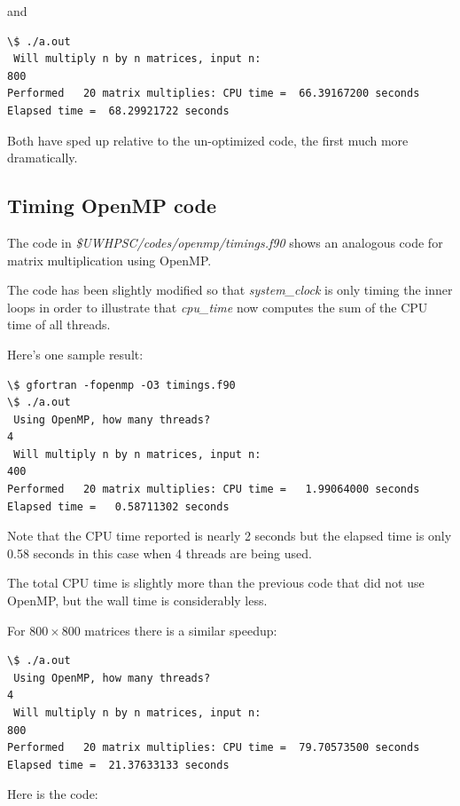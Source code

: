 \documentclass[letterpaper,10pt,english]{sphinxmanual}
\begin{document}
and

\begin{Verbatim}[commandchars=\\\{\}]
\$ ./a.out
 Will multiply n by n matrices, input n:
800
Performed   20 matrix multiplies: CPU time =  66.39167200 seconds
Elapsed time =  68.29921722 seconds
\end{Verbatim}

Both have sped up relative to the un-optimized code, the first much more
dramatically.


\subsection{Timing OpenMP code}
\label{timing:timing-openmp-code}
The code in \emph{\$UWHPSC/codes/openmp/timings.f90} shows an analogous code for
matrix multiplication using OpenMP.

The code has been slightly modified so that \emph{system\_clock} is only timing
the inner loops in order to illustrate that \emph{cpu\_time} now computes the sum
of the CPU time of all threads.

Here's one sample result:

\begin{Verbatim}[commandchars=\\\{\}]
\$ gfortran -fopenmp -O3 timings.f90
\$ ./a.out
 Using OpenMP, how many threads?
4
 Will multiply n by n matrices, input n:
400
Performed   20 matrix multiplies: CPU time =   1.99064000 seconds
Elapsed time =   0.58711302 seconds
\end{Verbatim}

Note that the CPU time reported is nearly 2 seconds but the elapsed time is
only 0.58 seconds in this case when 4 threads are being used.

The total CPU time is slightly more than the previous code that did not use
OpenMP, but the wall time is considerably less.

For $800\times 800$ matrices there is a similar speedup:

\begin{Verbatim}[commandchars=\\\{\}]
\$ ./a.out
 Using OpenMP, how many threads?
4
 Will multiply n by n matrices, input n:
800
Performed   20 matrix multiplies: CPU time =  79.70573500 seconds
Elapsed time =  21.37633133 seconds
\end{Verbatim}

Here is the code:
\end{document}
